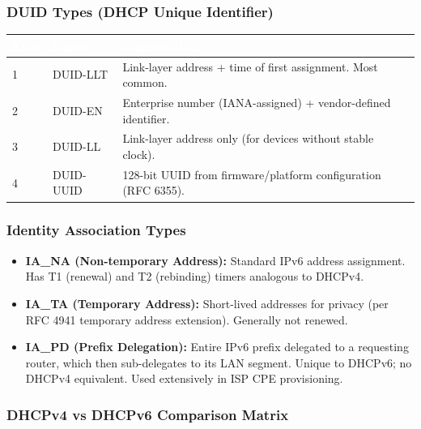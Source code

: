 \documentclass[11pt,letterpaper]{article}
\newcommand{\tableheader}[1]{\textbf{\sffamily\textcolor{white}{#1}}}
\begin{document}
\subsubsection{DUID Types (DHCP Unique Identifier)}

\begin{center}
\begin{tabularx}{\textwidth}{C{1.5cm}L{3cm}X}
\toprule
{}
\tableheader{Type} & \tableheader{Name} & \tableheader{Construction} \\
 & DUID-LLT & Link-layer address + time of first assignment. Most common. \\
2 & DUID-EN & Enterprise number (IANA-assigned) + vendor-defined identifier. \\
3 & DUID-LL & Link-layer address only (for devices without stable clock). \\
4 & DUID-UUID & 128-bit UUID from firmware/platform configuration (RFC 6355). \\
\bottomrule
\end{tabularx}
\end{center}

\subsubsection{Identity Association Types}

\begin{itemize}[noitemsep]
  \item \textbf{IA\_NA (Non-temporary Address):} Standard IPv6 address assignment. Has T1 (renewal) and T2 (rebinding) timers analogous to DHCPv4.
  \item \textbf{IA\_TA (Temporary Address):} Short-lived addresses for privacy (per RFC 4941 temporary address extension). Generally not renewed.
  \item \textbf{IA\_PD (Prefix Delegation):} Entire IPv6 prefix delegated to a requesting router, which then sub-delegates to its LAN segment. Unique to DHCPv6; no DHCPv4 equivalent. Used extensively in ISP CPE provisioning.
\end{itemize}

\subsubsection{DHCPv4 vs DHCPv6 Comparison Matrix}
\end{document}
